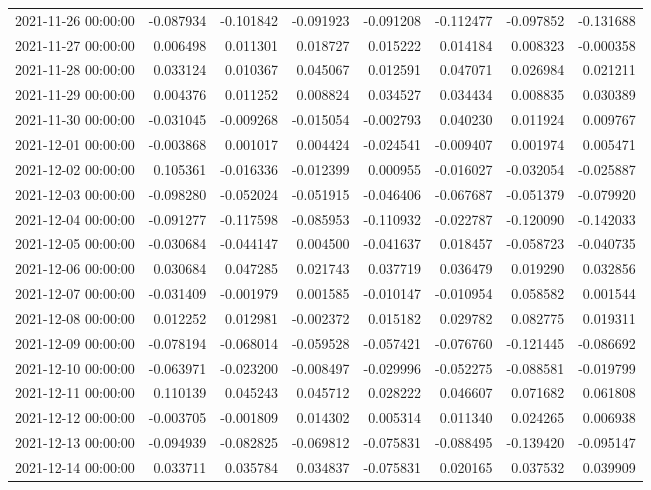 \begin{tabular}{lrrrrrrr}
2021-11-26 00:00:00 & -0.087934 & -0.101842 & -0.091923 & -0.091208 & -0.112477 & -0.097852 & -0.131688 \\
2021-11-27 00:00:00 & 0.006498 & 0.011301 & 0.018727 & 0.015222 & 0.014184 & 0.008323 & -0.000358 \\
2021-11-28 00:00:00 & 0.033124 & 0.010367 & 0.045067 & 0.012591 & 0.047071 & 0.026984 & 0.021211 \\
2021-11-29 00:00:00 & 0.004376 & 0.011252 & 0.008824 & 0.034527 & 0.034434 & 0.008835 & 0.030389 \\
2021-11-30 00:00:00 & -0.031045 & -0.009268 & -0.015054 & -0.002793 & 0.040230 & 0.011924 & 0.009767 \\
2021-12-01 00:00:00 & -0.003868 & 0.001017 & 0.004424 & -0.024541 & -0.009407 & 0.001974 & 0.005471 \\
2021-12-02 00:00:00 & 0.105361 & -0.016336 & -0.012399 & 0.000955 & -0.016027 & -0.032054 & -0.025887 \\
2021-12-03 00:00:00 & -0.098280 & -0.052024 & -0.051915 & -0.046406 & -0.067687 & -0.051379 & -0.079920 \\
2021-12-04 00:00:00 & -0.091277 & -0.117598 & -0.085953 & -0.110932 & -0.022787 & -0.120090 & -0.142033 \\
2021-12-05 00:00:00 & -0.030684 & -0.044147 & 0.004500 & -0.041637 & 0.018457 & -0.058723 & -0.040735 \\
2021-12-06 00:00:00 & 0.030684 & 0.047285 & 0.021743 & 0.037719 & 0.036479 & 0.019290 & 0.032856 \\
2021-12-07 00:00:00 & -0.031409 & -0.001979 & 0.001585 & -0.010147 & -0.010954 & 0.058582 & 0.001544 \\
2021-12-08 00:00:00 & 0.012252 & 0.012981 & -0.002372 & 0.015182 & 0.029782 & 0.082775 & 0.019311 \\
2021-12-09 00:00:00 & -0.078194 & -0.068014 & -0.059528 & -0.057421 & -0.076760 & -0.121445 & -0.086692 \\
2021-12-10 00:00:00 & -0.063971 & -0.023200 & -0.008497 & -0.029996 & -0.052275 & -0.088581 & -0.019799 \\
2021-12-11 00:00:00 & 0.110139 & 0.045243 & 0.045712 & 0.028222 & 0.046607 & 0.071682 & 0.061808 \\
2021-12-12 00:00:00 & -0.003705 & -0.001809 & 0.014302 & 0.005314 & 0.011340 & 0.024265 & 0.006938 \\
2021-12-13 00:00:00 & -0.094939 & -0.082825 & -0.069812 & -0.075831 & -0.088495 & -0.139420 & -0.095147 \\
2021-12-14 00:00:00 & 0.033711 & 0.035784 & 0.034837 & -0.075831 & 0.020165 & 0.037532 & 0.039909 \\

\end{tabular}

